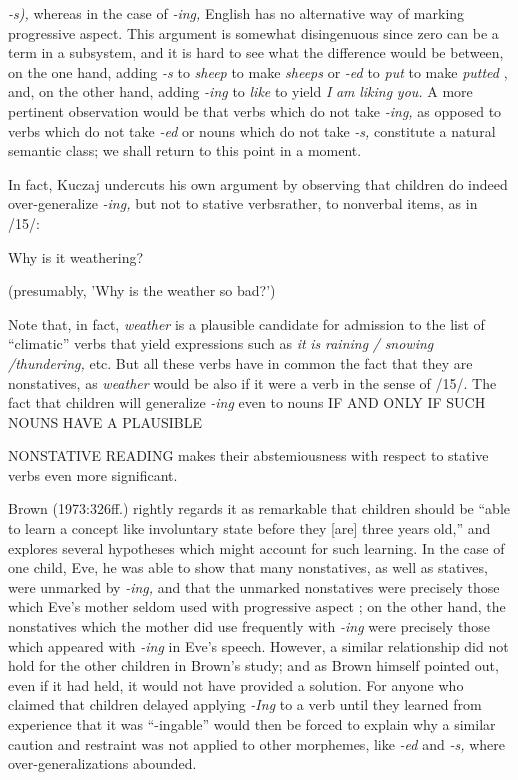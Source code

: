 \textit{{}-}\textit{s}\textit{),} whereas in the case of \textit{{}-ing,} English has no alternative way of marking progressive aspect. This argument is somewhat disingenuous since zero can be a term in a subsystem, and it is hard to see what the difference would be between, on the one hand, adding \textit{{}-s} to \textit{sheep }to make \textit{sheeps} or \textit{{}-ed} to \textit{put} to make \textit{putted} , and, on the other hand, adding \textit{{}-ing} to \textit{like} to yield \textit{I} \textit{am} \textit{liking} \textit{you. }A more pertinent observa\-tion would be that verbs which do not take \textit{{}-ing,} as opposed to verbs which do not take \textit{{}-ed} or nouns which do not take \textit{{}-s,} constitute a natural semantic class; we shall return to this point in a moment.

In fact, Kuczaj undercuts his own argument by observing that children do indeed over-generalize \textit{{}-ing,} but not to stative verbs\-rather, to nonverbal items, as in /15/:

\ea\label{ex:15}
 Why is it weathering?
\glt
\z

(presumably, 'Why is the weather so bad?')


Note that, in fact, \textit{weather }is a plausible candidate for admission to the list of ``climatic'' verbs that yield expressions such as \textit{it} \textit{is} \textit{raining} \textit{/} \textit{snowing} \textit{/thundering, }etc. But all these verbs have in common the fact that they are nonstatives, as \textit{weather }would be also if it were a verb in the sense of /15/. The fact that children will generalize \textit{{}-ing} even to nouns IF AND ONLY IF SUCH NOUNS HAVE A PLAUSIBLE

NONSTATIVE READING makes their abstemiousness with respect to stative verbs even more significant.

Brown (1973:326ff.) rightly regards it as remarkable that chil\-dren should be ``able to learn a concept like involuntary state before they [are] three years old,'' and explores several hypotheses which might account for such learning. In the case of one child, Eve, he was able to show that many nonstatives, as well as statives, were unmarked by \textit{{}-ing,} and that the unmarked nonstatives were precisely those which Eve's mother seldom used with progressive aspect ; on the other hand, the nonstatives which the mother did use frequently with \textit{{}-ing} were precisely those which appeared with \textit{{}-ing }in Eve's speech. However, a similar relationship did not hold for the other children in Brown's study; and as Brown himself pointed out, even if it had held, it would not have provided a solution. For anyone who claimed that children delayed applying \textit{{}-I}\textit{n}\textit{g} to a verb until they learned from experience that it was ``{}-ingable'' would then be forced to explain why a similar caution and restraint was not applied to other morphemes, like \textit{{}-ed }and \textit{{}-s,} where over-generalizations abounded.

